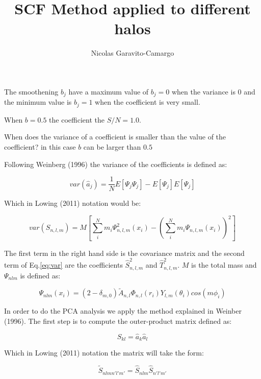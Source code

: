 \documentclass[12pt]{article}
\begin{document}
\title{SCF Method applied to different halos}%
\author{Nicolas Garavito-Camargo} 

\maketitle

The smoothening $b_j$ have a maximum value of $b_j=0$ when the
variance is $0$ and the minimum value is $b_j=1$ when the coefficient
is very small.

When $b=0.5$ the coefficient the $S/N=1.0$.

When does the variance of a coefficient is smaller than the value
of the coefficient? in this case  $b$ can be larger than $0.5$

Following Weinberg (1996) the variance of the coefficients is defined
as:

\begin{equation}
var(\hat{a}_j) = \dfrac{1}{N}{E[\Psi_j\Psi_j] - E[\Psi_j]E[\Psi_j]}
\end{equation}

Which in Lowing (2011) notation would be:

\begin{equation}\label{eq:var}
var(S_{n,l,m}) = M \left[ \sum_{i}^{N}m_i \Psi_{n,l,m}^2(x_i)
 - \left(\sum_{i}^{N}m_i \Psi_{n,l,m}(x_i)\right)^2
\right]
\end{equation}

The first term in the right hand side is the covariance matrix and
the second term of Eq.\ref{eq:var} are the coefficients
$\hat{S}_{n,l,m}^2$ and $\hat{T}_{n,l,m}^2$. $M$ is the total
mass and $\Psi_{nlm}$ is defined as:

\begin{equation}
\Psi_{nlm}(x_i) = (2-\delta_{m,0})
\tilde{A}_{n,l}\Phi_{n,l}(r_i)Y_{l,m}(\theta_i)cos(m\phi_i)
\end{equation}

In order to do the PCA analysis we apply the method explained in
Weinber (1996). The first step is to compute 
the outer-product matrix defined as:

\begin{equation}
S_{kl} = \hat{a}_k \hat{a}_l
\end{equation}

Which in Lowing (2011) notation the matrix will take the form:

\begin{equation}
\tilde{S}_{nlm n'l'm'} = \hat{S}_{nlm} \hat{S}_{n'l'm'}
\end{equation}
\end{document}
